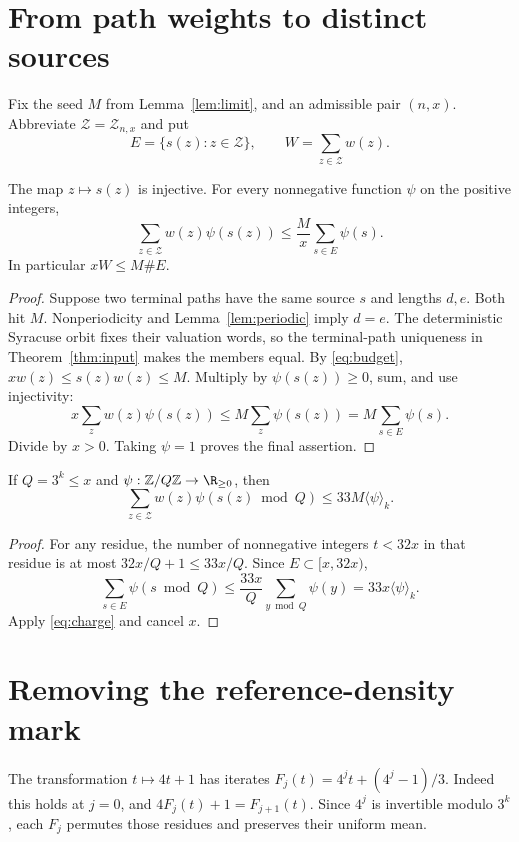 \section{From path weights to distinct sources}
Fix the seed $M$ from Lemma~\ref{lem:limit}, and an admissible pair $(n,x)$.
Abbreviate $\mathcal Z=\mathcal Z_{n,x}$ and put
\[
 E=\{s(z):z\in\mathcal Z\},\qquad W=\sum_{z\in\mathcal Z}w(z).
\]
\begin{lemma}\label{lem:charge}
The map $z\mapsto s(z)$ is injective. For every nonnegative function
$\psi$ on the positive integers,
\begin{equation}\label{eq:charge}
 \sum_{z\in\mathcal Z}w(z)\psi(s(z))
 \le\frac Mx\sum_{s\in E}\psi(s).
\end{equation}
In particular $xW\le M\#E$.
\end{lemma}
\begin{proof}
Suppose two terminal paths have the same source $s$ and lengths $d,e$.
Both hit $M$. Nonperiodicity and Lemma~\ref{lem:periodic} imply $d=e$.
The deterministic Syracuse orbit fixes their valuation words, so the
terminal-path uniqueness in Theorem~\ref{thm:input} makes the members equal.
By \eqref{eq:budget}, $xw(z)\le s(z)w(z)\le M$. Multiply by
$\psi(s(z))\ge0$, sum, and use injectivity:
\[
 x\sum_z w(z)\psi(s(z))\le M\sum_z\psi(s(z))
 =M\sum_{s\in E}\psi(s).
\]
Divide by $x>0$. Taking $\psi=1$ proves the final assertion.
\end{proof}

\begin{lemma}\label{lem:census}
If $Q=3^k\le x$ and $\psi:\mathbb Z/Q\mathbb Z\to\R_{\ge0}$, then
\begin{equation}\label{eq:census}
 \sum_{z\in\mathcal Z}w(z)\psi(s(z)\bmod Q)\le33M\langle\psi\rangle_k.
\end{equation}
\end{lemma}
\begin{proof}
For any residue, the number of nonnegative integers $t<32x$ in that
residue is at most $32x/Q+1\le33x/Q$. Since $E\subset[x,32x)$,
\[
 \sum_{s\in E}\psi(s\bmod Q)
 \le\frac{33x}{Q}\sum_{y\bmod Q}\psi(y)=33x\langle\psi\rangle_k.
\]
Apply \eqref{eq:charge} and cancel $x$.
\end{proof}

\section{Removing the reference-density mark}
The transformation $t\mapsto4t+1$ has iterates
$F_j(t)=4^jt+(4^j-1)/3$. Indeed this holds at $j=0$, and
$4F_j(t)+1=F_{j+1}(t)$. Since $4^j$ is invertible modulo $3^k$,
each $F_j$ permutes those residues and preserves their uniform mean.

